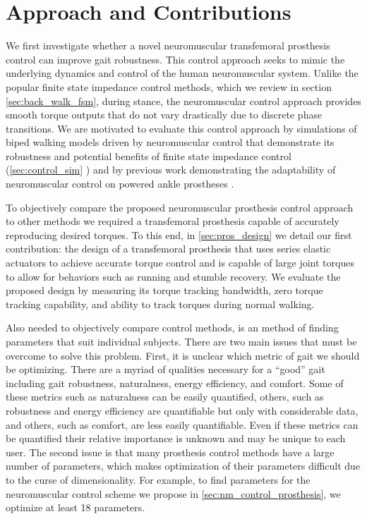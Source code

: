 \section{Approach and Contributions}\label{sec:intro_approach_contrib} 

We first investigate whether a novel neuromuscular transfemoral prosthesis
control can improve gait robustness. This control approach seeks to mimic the
underlying dynamics and control of the human neuromuscular system. Unlike the
popular finite state impedance control methods, which we review in section
\cref{sec:back_walk_fsm}, during stance, the neuromuscular control approach
provides smooth torque outputs that do not vary drastically due to discrete
phase transitions.  We are motivated to evaluate this control approach by
simulations of biped walking models driven by neuromuscular control that
demonstrate its robustness \citep{song2013integration,song2015neural} and
potential benefits of finite state impedance control (\cref{sec:control_sim}
\citep{thatte2016toward}) and by previous work demonstrating the adaptability of
neuromuscular control on powered ankle prostheses
\citep{eilenberg2010control,markowitz2011speed}.

To objectively compare the proposed neuromuscular prosthesis control approach to
other methods we required a transfemoral prosthesis capable of accurately
reproducing desired torques. To this end, in \cref{sec:pros_design} we detail
our first contribution: the design of a transfemoral prosthesis that uses series
elastic actuators to achieve accurate torque control and is capable of large
joint torques to allow for behaviors such as running and stumble recovery.  We
evaluate the proposed design by measuring its torque tracking bandwidth, zero
torque tracking capability, and ability to track torques during normal walking.

Also needed to objectively compare control methods, is an method of finding
parameters that suit individual subjects. There are two main issues that must be
overcome to solve this problem. First, it is unclear which metric of gait we
should be optimizing. There are a myriad of qualities necessary for a ``good''
gait including gait robustness, naturalness, energy efficiency, and comfort.
Some of these metrics such as naturalness can be easily quantified, others, such
as robustness and energy efficiency are quantifiable but only with considerable
data, and others, such as comfort, are less easily quantifiable. Even if these
metrics can be quantified their relative importance is unknown and may be unique
to each user. The second issue is that many prosthesis control methods have a
large number of parameters, which makes optimization of their parameters
difficult due to the curse of dimensionality. For example, to find parameters
for the neuromuscular control scheme we propose in 
\cref{sec:nm_control_prosthesis}, we optimize at least 18 parameters.

